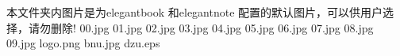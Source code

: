 本文件夹内图片是为elegantbook 和elegantnote 配置的默认图片，可以供用户选择，请勿删除!
00.jpg
01.jpg
02.jpg
03.jpg
04.jpg
05.jpg
06.jpg
07.jpg
08.jpg
09.jpg
logo.png  %
bnu.jpg   %
dzu.eps   %
